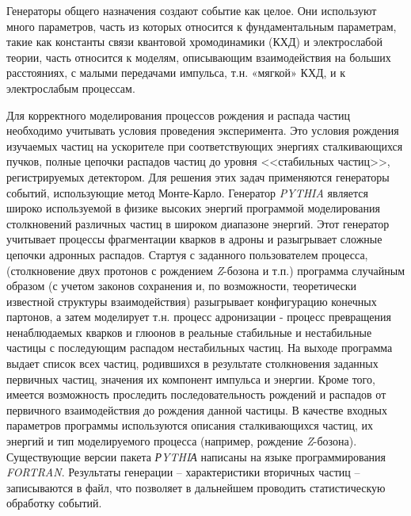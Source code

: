 Генераторы общего назначения создают событие как целое. Они используют много параметров, часть из которых относится к фундаментальным параметрам, такие как константы связи квантовой хромодинамики (КХД) и электрослабой теории, часть относится к моделям, описывающим взаимодействия на больших расстояниях, с малыми передачами импульса, т.н. «мягкой» КХД, и к электрослабым процессам.

Для корректного моделирования процессов рождения и распада частиц необходимо учитывать условия проведения эксперимента. Это условия рождения изучаемых частиц на ускорителе при соответствующих энергиях сталкивающихся пучков, полные цепочки распадов частиц до уровня <<стабильных частиц>>, регистрируемых детектором. Для решения этих задач применяются генераторы событий, использующие метод Монте-Карло.
Генератор \textit{PYTHIA} является широко используемой в физике высоких энергий программой моделирования столкновений различных частиц в широком диапазоне энергий. Этот генератор учитывает процессы фрагментации кварков в адроны и разыгрывает сложные цепочки адронных распадов. Стартуя с заданного пользователем процесса, (столкновение двух протонов с рождением \textit{Z}-бозона и т.п.) программа случайным образом (с учетом законов сохранения и, по возможности, теоретически известной структуры взаимодействия) разыгрывает конфигурацию конечных партонов, а затем моделирует т.н. процесс адронизации - процесс превращения ненаблюдаемых кварков и глюонов в реальные стабильные и нестабильные частицы с последующим распадом нестабильных частиц. На выходе программа выдает список всех частиц, родившихся в результате столкновения заданных первичных частиц, значения их компонент импульса и энергии. Кроме того, имеется возможность проследить последовательность рождений и распадов от первичного взаимодействия до рождения данной частицы. В качестве входных параметров программы используются описания сталкивающихся частиц, их энергий и тип моделируемого процесса (например, рождение \textit{Z}-бозона). Существующие версии пакета \textit{РYTHIА} написаны на языке программирования \textit{FORTRAN}.
Результаты генерации -- характеристики вторичных частиц -- записываются в файл, что позволяет в дальнейшем проводить статистическую обработку событий.